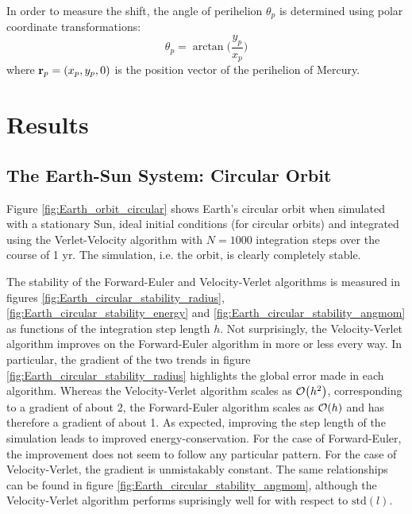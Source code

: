 \documentclass[reprint,english]{revtex4-1}
\begin{document}
In order to measure the shift, the angle of perihelion \(\theta_p\) is determined using polar coordinate transformations:
\begin{equation}
\theta_p=\arctan\Big(\frac{y_p}{x_p}\Big)
\end{equation}
where \(\vb{r}_p=(x_p,y_p,0)\) is the position vector of the perihelion of Mercury.
\section{Results}
\subsection{The Earth-Sun System: Circular Orbit}
Figure \ref{fig:Earth_orbit_circular} shows Earth's circular orbit when simulated with a stationary Sun, ideal initial conditions (for circular orbits) and integrated using the Verlet-Velocity algorithm with \(N=1000\) integration steps over the course of 1 yr. The simulation, i.e. the orbit, is clearly completely stable.

The stability of the Forward-Euler and Velocity-Verlet algorithms is measured in figures \ref{fig:Earth_circular_stability_radius}, \ref{fig:Earth_circular_stability_energy} and \ref{fig:Earth_circular_stability_angmom} as functions of the integration step length \(h\). Not surprisingly, the Velocity-Verlet algorithm improves on the Forward-Euler algorithm in more or less every way. In particular, the gradient of the two trends in figure \ref{fig:Earth_circular_stability_radius} highlights the global error made in each algorithm. Whereas the Velocity-Verlet algorithm scales as \(\order{h^2}\), corresponding to a gradient of about 2, the Forward-Euler algorithm scales as \(\order{h}\) and has therefore a gradient of about 1. As expected, improving the step length of the simulation leads to improved energy-conservation. For the case of Forward-Euler, the improvement does not seem to follow any particular pattern. For the case of Velocity-Verlet, the gradient is unmistakably constant. The same relationships can be found in figure \ref{fig:Earth_circular_stability_angmom}, although the Velocity-Verlet algorithm performs suprisingly well for with respect to \(\text{std}(l)\).
\end{document}
